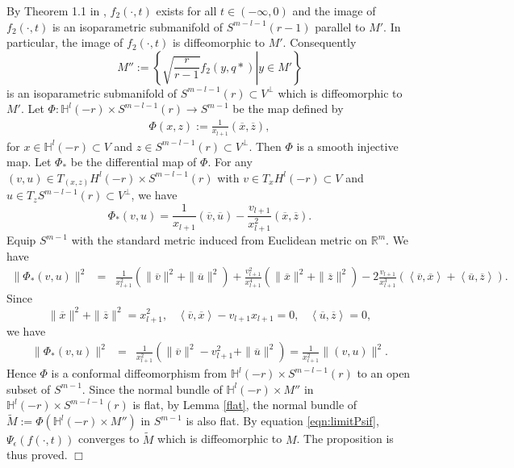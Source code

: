 \documentclass[12pt]{article}
\begin{document}
By Theorem 1.1 in \cite{X.C}, $f_2(\cdot, t)$ exists for all $t \in (-\infty, 0)$ and the image of $f_2(\cdot, t)$
is an isoparametric submanifold of $S^{m-l-1}(r-1)$ parallel to $M'$. In particular, the image of $f_2(\cdot, t)$
is diffeomorphic to $M'$. Consequently
\[ M'' := \left\{ \left. \sqrt{\frac{r}{r-1}} f_2(y,q*) \right| y \in M' \right\} \]
is an isoparametric submanifold of $S^{m-l-1}(r) \subset V^\perp$ which is diffeomorphic to $M'$.
Let
$\Phi:\mathbb H^l(-r)\times S^{m-l-1}(r)\rightarrow S^{m-1}$ be the map defined by
\begin{align*}
	\Phi(x,z) := \frac{1}{x_{l+1}} (\overline{x}, \overline{z}),
\end{align*}
for $x \in \mathbb H^l(-r) \subset V$ and $z \in S^{m-l-1}(r) \subset V^\perp$.
Then $\Phi$ is a smooth injective map. Let $\Phi_*$ be the differential map of $\Phi$.
For any
$ (v, u) \in T_{(x, z)} H^l(-r)\times S^{m-l-1}(r) $
with $v \in T_x H^l(-r) \subset V$ and $u \in T_z S^{m-l-1}(r) \subset V^\perp$, we have
\[ \Phi_*(v, u) = \frac{1}{x_{l+1}} (\overline{v}, \overline{u}) - \frac{v_{l+1}}{x_{l+1}^2} (\overline{x}, \overline{z}). \]
Equip $S^{m-1}$ with the standard metric induced from Euclidean metric on $\mathbb{R}^m$.
We have
\begin{eqnarray*}
\| \Phi_*(v, u) \|^2
&=& \frac{1}{x_{l+1}^2} (\| \overline{v} \|^2 + \|\overline{u}\|^2) + \frac{v_{l+1}^2}{x_{l+1}^4} (\|\overline{x}\|^2 + \|\overline{z}\|^2)
    - 2 \frac{v_{l+1}}{x_{l+1}^3} (\left< \overline{v}, \overline{x} \right> + \left<\overline{u}, \overline{z} \right> ).
\end{eqnarray*}
Since
\[ \|\overline{x}\|^2 + \|\overline{z}\|^2 = x_{l+1}^2, \hspace{10pt}
\left< \overline{v}, \overline{x} \right> - v_{l+1} x_{l+1} = 0, \hspace{10pt}
\left<\overline{u}, \overline{z} \right> = 0, \]
we have
\begin{eqnarray*}
\| \Phi_*(v, u) \|^2
&=& \frac{1}{x_{l+1}^2} (\|\overline{v}\|^2 - v_{l+1}^2 + \|\overline{u}\|^2) = \frac{1}{x_{l+1}^2} \|(v, u) \|^2.
\end{eqnarray*}
Hence $\Phi$ is a conformal diffeomorphism  from $\mathbb H^l(-r)\times S^{m-l-1}(r)$ to
an open subset of $S^{m-1}$.
Since the normal bundle of $\mathbb H^l(-r)\times M''$ in $\mathbb H^l(-r)\times S^{m-l-1}(r)$ is flat,
by Lemma \ref{flat}, the normal bundle of $\widetilde{M}:= \Phi(\mathbb H^l(-r)\times M'')$
in $S^{m-1}$  is also flat.
By equation \eqref{eqn:limitPsif}, $\Psi_\epsilon(f(\cdot, t))$ converges to
$\widetilde{M}$ which is diffeomorphic to $M$.
The proposition is thus proved.
$\Box$
\end{document}
